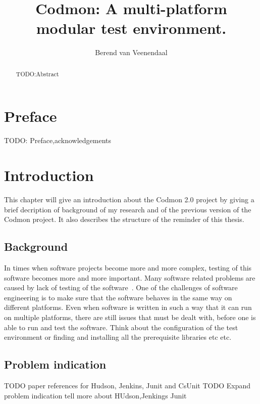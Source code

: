 \documentclass[a4paper,10pt]{scrartcl}
\title{Codmon: A multi-platform modular test environment.}
\author{Berend van Veenendaal}
\newcommand{\project}{Codmon 2.0}
\begin{document}
\maketitle

\begin{abstract}
TODO:Abstract
\end{abstract}
\newpage
\section*{Preface}
\label{sec:Preface}
TODO: Preface,acknowledgements
\newpage
\tableofcontents
\newpage

\section{Introduction}
\label{sec:Introduction}
This chapter will give an introduction about the \project{} project by giving a brief decription of background of my research and of the
previous version of the Codmon project. It also describes the structure of the reminder of this thesis.

\subsection{Background}
\label{sec:Background}
In times when software projects become more and more complex, testing of this software becomes more and more important. Many software
related problems are caused by lack of testing of the software~\cite{TTCST}. One of the challenges of software engineering is to make
sure that the software behaves in the same way on different platforms. Even when software is written in such a way that it can run on multiple platforms, there 
are still issues that must be dealt with, before one is able to run and test the software. Think about the configuration of the test environment 
or finding and installing all the prerequisite libraries etc etc. 

\subsection{Problem indication}
\label{subsec:Problemindication}
TODO paper references for Hudson, Jenkins, Junit and CsUnit 
TODO Expand problem indication tell more about HUdson,Jenkings Junit
\end{document}
